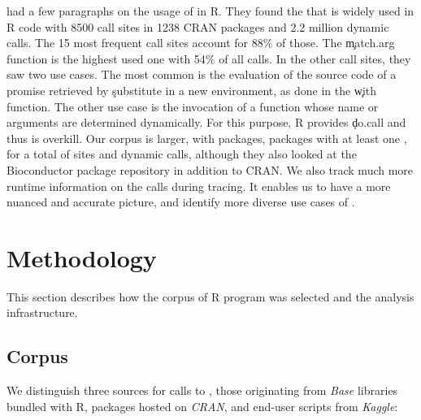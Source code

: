 \documentclass[screen,acmsmall]{acmart}%
\begin{document}
\citet{ecoop12} had a few paragraphs on the usage of \eval in R. They found the
that \eval is widely used in R code with 8500 call sites in 1238 CRAN packages
and 2.2 million dynamic calls. The 15 most frequent call sites account for 88\%
of those. The \c{match.arg} function is the highest used one with 54\% of all
calls. In the other call sites, they saw two use cases. The most common is the
evaluation of the source code of a promise retrieved by \c{substitute} in a new
environment, \eg as done in the \c{with} function. The other use case is the
invocation of a function whose name or arguments are determined dynamically. For
this purpose, R provides \c{do.call} and thus \eval is overkill. Our corpus is
larger, with \CranPackages packages, \packageTriggeredpkgs packages with at
least one \eval, for a total of \PkgHitEvalCallSites sites and
\packageAllcallsRnd dynamic calls, although they also looked at the Bioconductor
package repository in addition to CRAN. We also track much more runtime
information on the \eval calls during tracing. It enables us to have a more
nuanced and accurate picture, and identify more diverse use cases of \eval.



\section{Methodology}

This section describes how the corpus of R program was selected and the analysis
infrastructure.

\subsection{Corpus}

We distinguish three sources for calls to \eval, those originating from
\emph{Base} libraries bundled with R, packages hosted on \emph{CRAN}, and
end-user scripts from \emph{Kaggle}:
\end{document}
